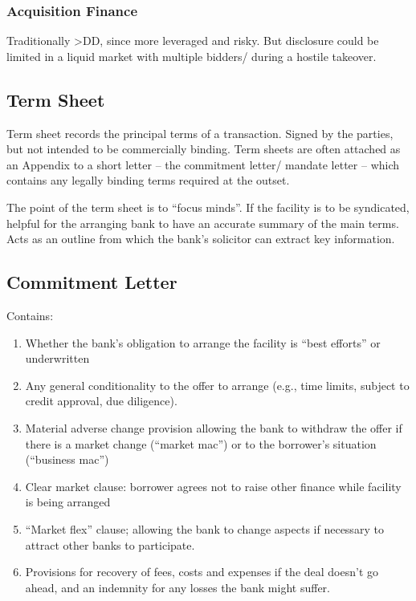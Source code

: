 \documentclass[
]{article}
\providecommand{\tightlist}{%
  \setlength{\itemsep}{0pt}\setlength{\parskip}{0pt}}
\begin{document}
\hypertarget{acquisition-finance}{%
\subsubsection{Acquisition Finance}\label{acquisition-finance}}

Traditionally \textgreater DD, since more leveraged and risky. But
disclosure could be limited in a liquid market with multiple bidders/
during a hostile takeover.

\hypertarget{term-sheet}{%
\subsection{Term Sheet}\label{term-sheet}}

Term sheet records the principal terms of a transaction. Signed by the
parties, but not intended to be commercially binding. Term sheets are
often attached as an Appendix to a short letter -- the commitment
letter/ mandate letter -- which contains any legally binding terms
required at the outset.

The point of the term sheet is to ``focus minds''. If the facility is to
be syndicated, helpful for the arranging bank to have an accurate
summary of the main terms. Acts as an outline from which the bank's
solicitor can extract key information.

\hypertarget{commitment-letter}{%
\subsection{Commitment Letter}\label{commitment-letter}}

Contains:

\begin{enumerate}
\tightlist
\item
  Whether the bank's obligation to arrange the facility is ``best
  efforts'' or underwritten
\item
  Any general conditionality to the offer to arrange (e.g., time limits,
  subject to credit approval, due diligence).
\item
  Material adverse change provision allowing the bank to withdraw the
  offer if there is a market change (``market mac'') or to the
  borrower's situation (``business mac'')
\item
  Clear market clause: borrower agrees not to raise other finance while
  facility is being arranged
\item
  ``Market flex'' clause; allowing the bank to change aspects if
  necessary to attract other banks to participate.
\item
  Provisions for recovery of fees, costs and expenses if the deal
  doesn't go ahead, and an indemnity for any losses the bank might
  suffer.
\end{enumerate}
\end{document}
